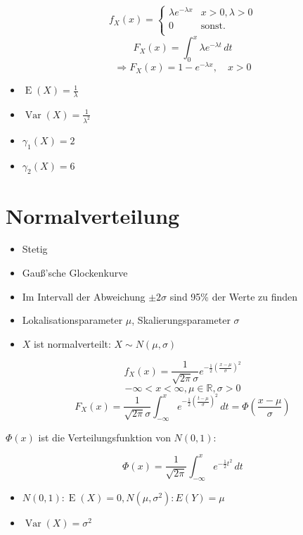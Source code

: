 \documentclass[a4paper,twocolumn]{article}
\DeclareMathOperator{\Var}{Var}
\DeclareMathOperator{\E}{E}
\begin{document}
\[
    f_X(x) = \left\{\begin{array}{ll}
        \lambda e^{-\lambda x} & x > 0, \lambda > 0 \\
        0                      & \text{sonst.} \\
    \end{array}\right.
\] \[
    F_X(x) = \int_0^x \lambda e^{-\lambda t}\,dt
\] \[
    \Rightarrow F_X(x) = 1 - e^{-\lambda x}, \quad x > 0
\]

\begin{itemize}
  \item $\E(X) = \frac1{\lambda}$
  \item $\Var(X) = \frac1{\lambda^2}$
  \item $\gamma_1(X) = 2$
  \item $\gamma_2(X) = 6$
\end{itemize}

\section{Normalverteilung}

\begin{itemize}
  \item Stetig
  \item Gauß'sche Glockenkurve
  \item Im Intervall der Abweichung $\pm 2\sigma$
        sind 95\% der Werte zu finden
  \item Lokalisationsparameter $\mu$,
        Skalierungsparameter $\sigma$
  \item $X$ ist normalverteilt: $X \sim N(\mu, \sigma)$
\end{itemize}

\[
    f_X(x) = \frac{1}{\sqrt{2\pi}\sigma}
        e^{-\frac12 \left(\frac{x-\mu}\sigma\right)^2}
\] \[
    -\infty < x < \infty, \mu \in \mathbb{R}, \sigma > 0
\] \[
    F_X(x) = \frac{1}{\sqrt{2\pi}\sigma}
        \int_{-\infty}^x e^{-\frac12 \left(\frac{t-\mu}\sigma\right)^2}\,dt
        = \Phi\left(\frac{x-\mu}{\sigma}\right)
\]

$\Phi(x)$ ist die Verteilungsfunktion von $N(0,1)$:

\[
    \Phi(x) = \frac1{\sqrt{2\pi}} \int_{-\infty}^x e^{-\frac12 t^2}\,dt
\]

\begin{itemize}
  \item $N(0,1): \E(X) = 0, N(\mu, \sigma^2): E(Y) = \mu$
  \item $\Var(X) = \sigma^2$
\end{itemize}
\end{document}
